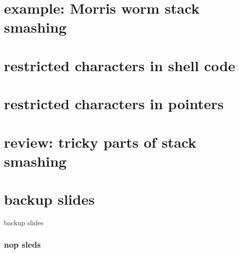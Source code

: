 \section{example: Morris worm stack smashing}



\section{restricted characters in shell code}
   

\section{restricted characters in pointers}


\section{review: tricky parts of stack smashing}







\section{backup slides}
\begin{frame}{backup slides}
\end{frame}

\subsubsection{nop sleds}





